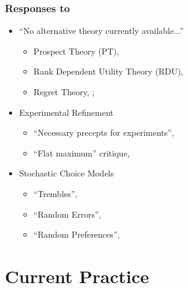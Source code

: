 \documentclass{beamer}
\begin{document}
\begin{frame}
\frametitle{Responses to \textcite{Grether1979}}
\begin{itemize}
	\item \enquote{No alternative theory currently available...}
		\begin{itemize}
			\item Prospect Theory (PT), \textcite{Kahneman1979}
			\item Rank Dependent Utility Theory (RDU), \textcite{Quiggin1982}
			\item Regret Theory, \textcite{Bell1982}; \textcite{Loomes1982}
		\end{itemize}
	\item Experimental Refinement
		\begin{itemize}
			\item \enquote{Necessary precepts for experiments}, \textcite{Smith1982}
			\item \enquote{Flat maximum} critique, \textcite{Harrison1989, Harrison1992}
		\end{itemize}
	\item Stochastic Choice Models
		\begin{itemize}
			\item \enquote{Trembles}, \textcite{Harless1994}
			\item \enquote{Random Errors}, \textcite{Hey1994}
			\item \enquote{Random Preferences}, \textcite{Loomes1995}
		\end{itemize}
\end{itemize}
\end{frame}

\section{Current Practice}
\end{document}
